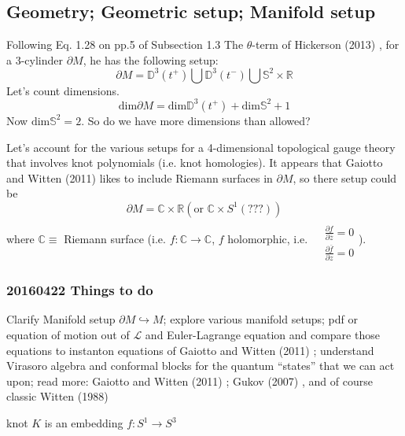 \documentclass[10pt]{amsart}
\begin{document}
\begin{multicols}{2}
\subsection{Geometry; Geometric setup; Manifold setup}

Following Eq. 1.28 on pp.5 of Subsection 1.3 The $\theta$-term of Hickerson (2013) \cite{Hick2013}, for a 3-cylinder $\partial M$, he has the following setup:
\[
\partial M = \mathbb{D}^3(t^+) \bigcup \mathbb{D}^3(t^-) \bigcup \mathbb{S}^2 \times \mathbb{R}
\]
Let's count dimensions.  
\[
\text{dim} \partial M  = \text{dim} \mathbb{D}^3(t^+) + \text{dim}\mathbb{S}^2 + 1 
\]
Now $\text{dim}\mathbb{S}^2 =2$.  So do we have more dimensions than allowed?  

Let's account for the various setups for a 4-dimensional topological gauge theory that involves knot polynomials (i.e. knot homologies).  It appears that Gaiotto and Witten (2011) \cite{GW2011} likes to include Riemann surfaces in $\partial M$, so there setup could be
\[
\partial M = \mathbb{C} \times \mathbb{R} (\text{or } \mathbb{C}\times S^1 (???) )
\]
where $\mathbb{C} \equiv $ Riemann surface (i.e. $f:\mathbb{C} \to \mathbb{C}$, $f$ holomorphic, i.e. $\begin{aligned} & \quad \\
  & \frac{ \partial f}{ \partial \overline{z}} = 0 \\
  & \frac{ \partial \overline{f}}{ \partial z } = 0 \end{aligned}$).  

\subsubsection{20160422 Things to do}

Clarify Manifold setup $\partial M \hookrightarrow M$; explore various manifold setups; pdf or equation of motion out of $\mathcal{L}$ and Euler-Lagrange equation and compare those equations to instanton equations of Gaiotto and Witten (2011) \cite{GW2011}; understand Virasoro algebra and conformal blocks for the quantum ``states'' that we can act upon; read more: Gaiotto and Witten (2011) \cite{GW2011}; Gukov (2007) \cite{Guko2007}, and of course classic Witten (1988) \cite{Witten:1988hf}


knot $K$ is an embedding $f: S^1 \to S^3$




\end{multicols}
\end{document}
